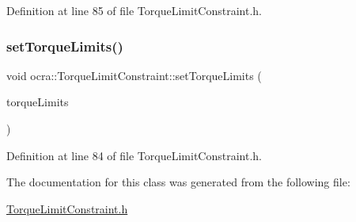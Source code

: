 Definition at line 85 of file Torque\+Limit\+Constraint.\+h.

\hypertarget{classocra_1_1TorqueLimitConstraint_aae5d3c15e07731fb19f2f55b45852554}{}\label{classocra_1_1TorqueLimitConstraint_aae5d3c15e07731fb19f2f55b45852554} 
\subsubsection{\texorpdfstring{set\+Torque\+Limits()}{setTorqueLimits()}}
{\footnotesize\ttfamily void ocra\+::\+Torque\+Limit\+Constraint\+::set\+Torque\+Limits (\begin{DoxyParamCaption}\item[{const Eigen\+::\+Vector\+Xd \&}]{torque\+Limits }\end{DoxyParamCaption})\hspace{0.3cm}{\ttfamily [inline]}}



Definition at line 84 of file Torque\+Limit\+Constraint.\+h.



The documentation for this class was generated from the following file\+:\begin{DoxyCompactItemize}
\item 
\hyperlink{TorqueLimitConstraint_8h}{Torque\+Limit\+Constraint.\+h}\end{DoxyCompactItemize}
